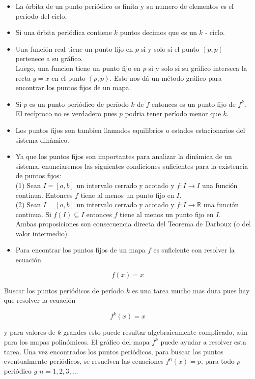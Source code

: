 \documentclass[11pt]{beamer}
\begin{document}
\begin{frame}[allowframebreaks]
\begin{itemize}
  \item La órbita de un punto periódico es finita y su numero de elementos es el período del ciclo.
  \item Si una órbita periódica contiene $k$ puntos decimos que es un $k$ - ciclo.
  \item Una función real tiene un punto fijo en $p$ si y solo si el punto $(p, p)$ pertenece a su gráfico.\\
Luego, una funcion tiene un punto fijo en $p$ si y solo si su gráfico interseca la recta $y=x$ en el punto $(p, p)$. Esto nos dá un método gráfico para encontrar los puntos fijos de un mapa.
  \item Si $p$ es un punto periódico de período $k$ de $f$ entonces es un punto fijo de $f^{k}$. El recíproco no es verdadero pues $p$ podria tener período menor que $k$.
  \item Los puntos fijos son tambien llamados equilibrios o estados estacionarios del sistema dinámico.
  \item Ya que los puntos fijos son importantes para analizar la dinámica de un sistema, enunciaremos las siguientes condiciones suficientes para la existencia de puntos fijos:\\
(1) Sean $I=[a, b]$ un intervalo cerrado y acotado y $f: I \rightarrow I$ una función continua. Entonces $f$ tiene al menos un punto fijo en $I$.\\
(2) Sean $I=[a, b]$ un intervalo cerrado y acotado y $f: I \rightarrow \mathbb{R}$ una función continua. Si $f(I) \subseteq I$ entonces $f$ tiene al menos un punto fijo en $I$.\\
Ambas proposiciones son consecuencia directa del Teorema de Darboux (o del valor intermedio)
  \item Para encontrar los puntos fijos de un mapa $f$ es suficiente con resolver la ecuación
\end{itemize}
$$
f(x)=x
$$

Buscar los puntos periódicos de período $k$ es una tarea mucho mas dura pues hay que resolver la ecuación

$$
f^{k}(x)=x
$$

y para valores de $k$ grandes esto puede resultar algebraicamente complicado, aún para los mapas polinómicos. El gráfico del mapa $f^{k}$ puede ayudar a resolver esta tarea. Una vez encontrados los puntos periódicos, para buscar los puntos eventualmente periódicos, se resuelven las ecuaciones $f^{n}(x)=p$, para todo $p$ periódico $y$ $n=1,2,3, \ldots$
\end{frame}
\end{document}
